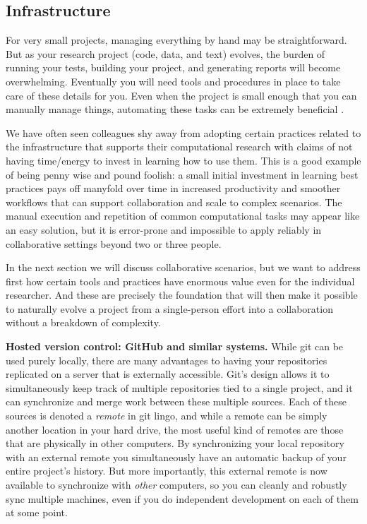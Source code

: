 \documentclass[ChapterTOCs,krantz2]{krantz} %
\newcommand{\blockpar}[1]{\vspace*{3mm} \noindent \textbf{#1}}
\begin{document}
\subsection{Infrastructure}

For very small projects, managing everything by hand may be straightforward.
But as your research project (code, data, and text) evolves, the burden of
running your tests, building your project, and generating reports will become
overwhelming. Eventually you will need tools and procedures in place to take
care of these details for you. Even when the project is small enough that you
can manually manage things, automating these tasks can be extremely beneficial
\cite{doar2005practical}.

We have often seen colleagues shy away from adopting certain practices related
to the infrastructure that supports their computational research with claims of
not having time/energy to invest in learning how to use them.  This is a good
example of being penny wise and pound foolish: a small initial investment in
learning best practices pays off manyfold over time in increased productivity
and smoother workflows that can support collaboration and scale to complex
scenarios.  The manual execution and repetition of common computational tasks
may appear like an easy solution, but it is error-prone and impossible to apply
reliably in collaborative settings beyond two or three people.

In the next section we will discuss collaborative scenarios, but we want to
address first how certain tools and practices have enormous value even for the
individual researcher.  And these are precisely the foundation that will then
make it possible to naturally evolve a project from a single-person effort into
a collaboration without a breakdown of complexity.

\blockpar{Hosted version control: GitHub and similar systems.}  While git can
be used purely locally, there are many advantages to having your repositories
replicated on a server that is externally accessible.  Git's design allows it
to simultaneously keep track of multiple repositories tied to a single project,
and it can synchronize and merge work between these multiple sources.  Each of
these sources is denoted a \emph{remote} in git lingo, and while a remote can
be simply another location in your hard drive, the most useful kind of remotes
are those that are physically in other computers.  By synchronizing your local
repository with an external remote you simultaneously have an automatic backup
of your entire project's history.  But more importantly, this external remote
is now available to synchronize with \emph{other} computers, so you can cleanly
and robustly sync multiple machines, even if you do independent development on
each of them at some point.
\end{document}
